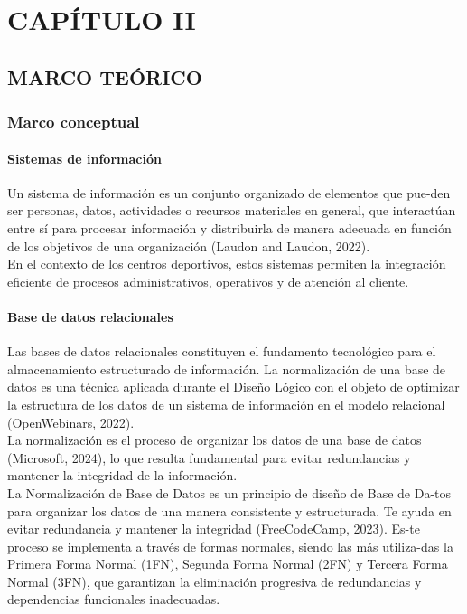 \documentclass[12pt, letterpaper]{article}
\begin{document}
\section*{CAPÍTULO II}
\setcounter{section}{2}
\subsection{MARCO TEÓRICO}
\subsubsection{Marco conceptual}
\paragraph{\textbf{Sistemas de información}} 
Un sistema de información es un conjunto organizado de elementos que pue-den ser personas, datos, actividades o recursos materiales en general, que interactúan entre sí para procesar información y distribuirla de manera adecuada en función de los objetivos de una organización (Laudon and Laudon, 2022).\\ En el contexto de los centros deportivos, estos sistemas permiten la integración eficiente de procesos administrativos, operativos y de atención al cliente.
\paragraph{\textbf{Base de datos relacionales}}
Las bases de datos relacionales constituyen el fundamento tecnológico para el almacenamiento estructurado de información. La normalización de una base de datos es una técnica aplicada durante el Diseño Lógico con el objeto de optimizar la estructura de los datos de un sistema de información en el modelo relacional (OpenWebinars, 2022).\\ La normalización es el proceso de organizar los datos de una base de datos (Microsoft, 2024), lo que resulta fundamental para evitar redundancias y mantener la integridad de la información.\\
La Normalización de Base de Datos es un principio de diseño de Base de Da-tos para organizar los datos de una manera consistente y estructurada. Te ayuda en evitar redundancia y mantener la integridad (FreeCodeCamp, 2023). Es-te proceso se implementa a través de formas normales, siendo las más utiliza-das la Primera Forma Normal (1FN), Segunda Forma Normal (2FN) y Tercera Forma Normal (3FN), que garantizan la eliminación progresiva de redundancias y dependencias funcionales inadecuadas.
\end{document}
